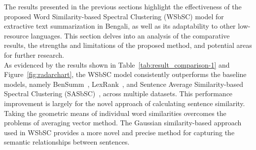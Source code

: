 The results presented in the previous sections highlight the effectiveness of the
proposed Word Similarity-based Spectral Clustering (WSbSC) model for extractive text summarization
in Bengali, as well as its adaptability to other low-resource languages.
This section delves into an analysis of the comparative results, the strengths and limitations of the proposed method,
and potential areas for further research.\\

As evidenced by the results shown in Table~\ref{tab:result_comparison-1} and Figure~\ref{fig:radarchart},
the WSbSC model consistently outperforms the baseline models,
namely BenSumm~\cite{das-2022-tfidf}, LexRank~\cite{Erkan-lexRank-2004}, and Sentence Average Similarity-based
Spectral Clustering (SASbSC)~\cite{roychowdhury-etal-2022-spectral-base}, across multiple datasets.
This performance improvement is largely for the novel approach of calculating sentence similarity.
Taking the geometric means of individual word similarities overcomes the problems of averaging vector method.
The Gaussian similarity-based approach used in WSbSC provides a more novel and precise method for
capturing the semantic relationships between sentences.\\

